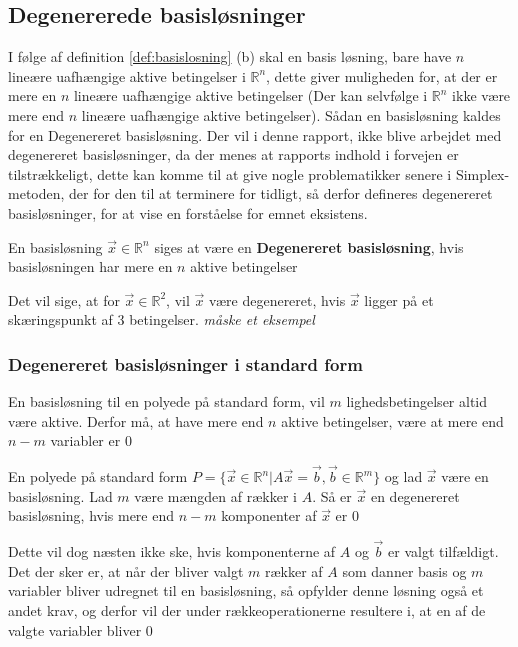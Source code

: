 \subsection{Degenererede basisløsninger}
I følge af definition \ref{def:basislosning} (b) skal en basis løsning, bare have $n$ lineære uafhængige aktive betingelser i $\mathds{R}^n$, dette giver muligheden for, at der er mere en $n$ lineære uafhængige aktive betingelser (Der kan selvfølge i $\mathds{R}^n$ ikke være mere end $n$ lineære uafhængige aktive betingelser). Sådan en basisløsning kaldes for en Degenereret basisløsning. Der vil i denne rapport, ikke blive arbejdet med degenereret basisløsninger, da der menes at rapports indhold i forvejen er tilstrækkeligt, dette kan komme til at give nogle problematikker senere i Simplex-metoden, der for den til at terminere for tidligt, så derfor defineres degenereret basisløsninger, for at vise en forståelse for emnet eksistens.
\begin{defn}
En basisløsning $\vec{x}\in \mathds{R}^n$ siges at være en \textbf{Degenereret basisløsning}, hvis basisløsningen har mere en $n$ aktive betingelser
\end{defn}

Det vil sige, at for $\vec{x}\in \mathds{R}^2$, vil $\vec{x}$ være degenereret, hvis $\vec{x}$ ligger på et skæringspunkt af $3$ betingelser.
\textit{måske et eksempel}\\
\subsubsection{Degenereret basisløsninger i standard form}
En basisløsning til en polyede på standard form, vil $m$ lighedsbetingelser altid være aktive. Derfor må, at have mere end $n$ aktive betingelser, være at mere end $n-m$ variabler er $0$
\begin{defn}
En polyede på standard form $P =\{ \vec{x} \in \mathds{R}^n | A \vec{x} = \vec{b}, \vec{b}\in \mathds{R}^m\}$ og lad $\vec{x}$ være en basisløsning. Lad $m$ være mængden af rækker i $A$. Så er $\vec{x}$ en degenereret basisløsning, hvis mere end $n-m$ komponenter af $\vec{x}$ er $0$
\end{defn}
Dette vil dog næsten ikke ske, hvis komponenterne af $A$ og $\vec{b}$ er valgt tilfældigt.
Det der sker er, at når der bliver valgt $m$ rækker af $A$ som danner basis og $m$ variabler bliver udregnet til en basisløsning, så opfylder denne løsning også et andet krav, og derfor vil der under rækkeoperationerne resultere i, at en af de valgte variabler bliver $0$
